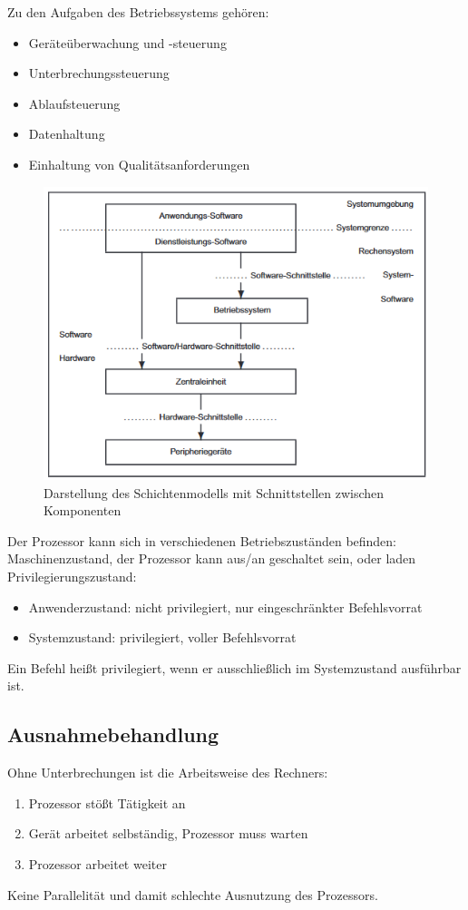 \documentclass[a4paper,12pt,leqno]{article}
\begin{document}
Zu den Aufgaben des Betriebssystems gehören:
\begin{itemize}
\item Geräteüberwachung und -steuerung
\item Unterbrechungssteuerung
\item Ablaufsteuerung
\item Datenhaltung
\item Einhaltung von Qualitätsanforderungen
\end{itemize}

\begin{figure}[h!]
\centering
\includegraphics[scale=0.7]{Grafiken/VerfeinertesSchichtenmodell.png}
\caption{Darstellung des Schichtenmodells mit Schnittstellen zwischen Komponenten}
\end{figure}

Der Prozessor kann sich in verschiedenen Betriebszuständen befinden:\\
Maschinenzustand, der Prozessor kann aus/an geschaltet sein, oder laden\\
Privilegierungszustand:
\begin{itemize}
\item Anwenderzustand: nicht privilegiert, nur eingeschränkter Befehlsvorrat
\item Systemzustand: privilegiert, voller Befehlsvorrat
\end{itemize}
Ein Befehl heißt privilegiert, wenn er ausschließlich im Systemzustand ausführbar ist.

\newpage

\subsection{Ausnahmebehandlung}
Ohne Unterbrechungen ist die Arbeitsweise des Rechners:
\begin{enumerate}
\item Prozessor stößt Tätigkeit an
\item Gerät arbeitet selbständig, Prozessor muss warten
\item Prozessor arbeitet weiter
\end{enumerate}
Keine Parallelität und damit schlechte Ausnutzung des Prozessors.\\
\end{document}
